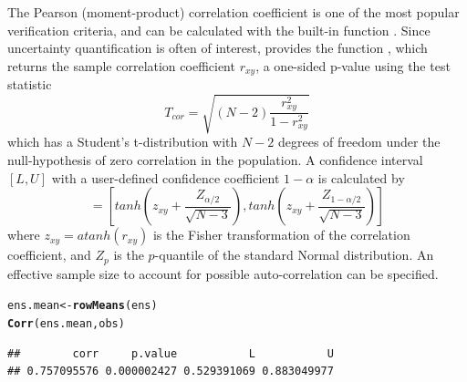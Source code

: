 \documentclass[article]{jss}\usepackage{graphicx, color}
\makeatletter
\newcommand{\hlfunctioncall}[1]{\textcolor[rgb]{0,0.501960784313725,0.752941176470588}{\textbf{#1}}}%
\newenvironment{kframe}{%
 \def\at@end@of@kframe{}%
 \ifinner\ifhmode%
  \def\at@end@of@kframe{\end{minipage}}%
  \begin{minipage}{\columnwidth}%
 \fi\fi%
 \def\FrameCommand##1{\hskip\@totalleftmargin \hskip-\fboxsep
 \colorbox{shadecolor}{##1}\hskip-\fboxsep
     \hskip-\linewidth \hskip-\@totalleftmargin \hskip\columnwidth}%
 \MakeFramed {\advance\hsize-\width
   \@totalleftmargin\z@ \linewidth\hsize
   \@setminipage}}%
 {\par\unskip\endMakeFramed%
 \at@end@of@kframe}
\newenvironment{knitrout}{}{} %
\makeatother
\begin{document}
The Pearson (moment-product) correlation coefficient is one of the most popular verification criteria, and can be calculated with the built-in  function .
Since uncertainty quantification is often of interest,  provides the function , which returns the sample correlation coefficient $r_{xy}$, a one-sided p-value using the test statistic
%
\begin{equation}
T_{cor} = \sqrt{(N-2) \frac{r_{xy}^2}{1 - r_{xy}^2}}
\end{equation}
%
which has a Student's t-distribution with $N-2$ degrees of freedom under the null-hypothesis of zero correlation in the population.
A confidence interval $[L,U]$ with a user-defined confidence coefficient $1-\alpha$ is calculated by
%
\begin{equation}
[L, U] = \left[ tanh\left(z_{xy} + \frac{Z_{\alpha/2}}{\sqrt{N-3}}\right), tanh\left(z_{xy} + \frac{Z_{1-\alpha/2}}{\sqrt{N-3}}\right)\right]\label{eq:fisherCi}
\end{equation} 
%
where $z_{xy} = atanh(r_{xy})$ is the Fisher transformation of the correlation coefficient, and $Z_p$ is the $p$-quantile of the standard Normal distribution.
An effective sample size to account for possible auto-correlation can be specified.
%
\begin{knitrout}
\color{fgcolor}\begin{kframe}
\begin{alltt}
ens.mean <- \hlfunctioncall{rowMeans}(ens)
\hlfunctioncall{Corr}(ens.mean, obs)
\end{alltt}
\begin{verbatim}
##        corr     p.value           L           U 
## 0.757095576 0.000002427 0.529391069 0.883049977
\end{verbatim}
\end{kframe}
\end{knitrout}
\end{document}
